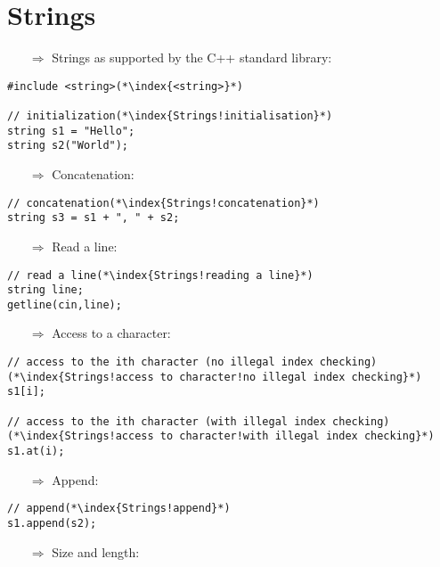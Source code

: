 \documentclass[10pt]{article}
\begin{document}
\section{Strings}
\small
\begin{enumerate}
\item[$\Rightarrow$] Strings as supported by the C++ standard library:
\end{enumerate}
\begin{lstlisting}
#include <string>(*\index{<string>}*)

// initialization(*\index{Strings!initialisation}*)
string s1 = "Hello";
string s2("World");
\end{lstlisting}
\begin{enumerate}
\item[$\Rightarrow$] Concatenation:
\end{enumerate}
\begin{lstlisting}
// concatenation(*\index{Strings!concatenation}*)
string s3 = s1 + ", " + s2;
\end{lstlisting}
\begin{enumerate}
\item[$\Rightarrow$] Read a line:
\end{enumerate}
\begin{lstlisting}
// read a line(*\index{Strings!reading a line}*)
string line;
getline(cin,line);
\end{lstlisting}
\begin{enumerate}
\item[$\Rightarrow$] Access to a character:
\end{enumerate}
\begin{lstlisting}
// access to the ith character (no illegal index checking)(*\index{Strings!access to character!no illegal index checking}*)
s1[i];

// access to the ith character (with illegal index checking)(*\index{Strings!access to character!with illegal index checking}*)
s1.at(i);
\end{lstlisting}
\begin{enumerate}
\item[$\Rightarrow$] Append:
\end{enumerate}
\begin{lstlisting}
// append(*\index{Strings!append}*)
s1.append(s2);
\end{lstlisting}
\begin{enumerate}
\item[$\Rightarrow$] Size and length:
\end{enumerate}
\end{document}
